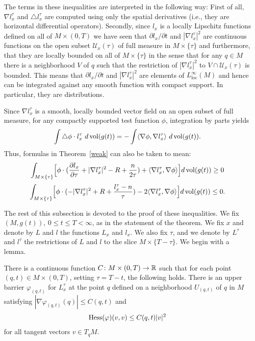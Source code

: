 \begin{remark}
\label{rem:l-weak-inequalities-interpretation}

The terms in these inequalities are interpreted in the following
way: First of all, $\nabla l^\tau_x$ and $\triangle l^\tau_x$ are
computed using only the spatial derivatives (i.e., they are
horizontal differential operators). Secondly, since $l_x$ is a
locally Lipschitz functions defined on all of $M\times (0,T)$ we
have seen that $\partial l_x/\partial t$ and $|\nabla l^\tau_x|^2$
are continuous functions on the open subset ${\mathcal U}_x(\tau)$
of full measure in $M\times\{\tau\}$ and furthermore, that they are
locally bounded on all of $M\times\{\tau\}$ in the sense that for
any $q\in M$ there is a neighborhood $V$ of $q$ such that the
restriction of $|\nabla l_x^\tau|^2$ to $V\cap {\mathcal U}_x(\tau)$
is bounded. This means that $\partial l_x/\partial t$ and $|\nabla
l_x^\tau|^2$ are elements of $L_\mathrm{loc}^\infty(M)$ and hence can
be integrated against any smooth function with compact support. In
particular, they are distributions.

 Since
$\nabla l^\tau_x$ is a smooth, locally bounded vector field on an
open subset of full measure, for any compactly supported test
function $\phi$, integration by parts yields
$$\int\triangle \phi\cdot l^\tau_x\ d\operatorname{vol}(g(t))=-\int \langle \nabla \phi,\nabla
l_x^\tau\rangle\ d\operatorname{vol}(g(t)).$$ Thus, formulas in
Theorem~\ref{weak} can also be taken to mean:
$$\int_{M\times \{\tau\}} \Bigl[\phi\cdot(\frac{\partial l_x}{\partial \tau}
+|\nabla l^\tau_x|^2-R+\frac{n}{2\tau})+ \langle \nabla
l_x^\tau,\nabla \phi \rangle\Bigr] d\operatorname{vol}(g(t))\ge 0$$
$$\int_{M\times\{\tau\}} \Bigl[\phi\cdot(-|\nabla
l^\tau_x|^2+R+\frac{l^\tau_x-n}{\tau})-2\langle\nabla
l^\tau_x,\nabla\phi \rangle\Bigr] d\operatorname{vol}(g(t))\le 0.$$
\end{remark}

The rest of this subsection is devoted to the proof of these
inequalities. We fix $(M,g(t)),\ 0\le t\le T<\infty$, as in the
statement of the theorem.
 We
fix $x$ and denote by $L$ and $l$ the functions $L_{x}$ and $l_{x}$.
We also fix $\tau$, and we denote by $L^\tau$ and $l^\tau$ the
restrictions of $L$ and $l$ to the slice $M\times \{T-\tau\}$. We
begin with a lemma.

\begin{lemma}
\label{lem:l-barrier-hessian-bound}
\label{phisupport}
There is a continuous function $C\colon M\times (0,T)\to \mathbb{R}$ such
that for each point $(q,t)\in M\times (0,T)$, setting $\tau=T-t$,
the following holds. There is an upper barrier $\varphi_{(q,t)}$ for
$L_x^\tau$ at the point $q$ defined on a neighborhood $U_{(q,t)}$ of
$q$ in $M$ satisfying $|\nabla \varphi_{(q,t)}(q)|\le C(q,t)$ and
$$\operatorname{Hess}(\varphi)(v,v)\le C(q,t)|v|^2$$
for all tangent vectors $v\in T_qM$.
\end{lemma}

